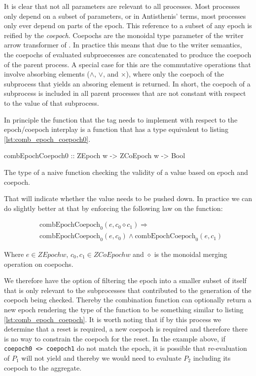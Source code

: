 It is clear that not all parameters are relevant to all processes.
Most processes only depend on a subset of parameters, or in
Antisthenis' terms, most processes only ever depend on parts of the
epoch. This reference to a subset of any epoch is reified by the
\emph{coepoch}. Coepochs are the monoidal type parameter of the writer
arrow transformer of .  In practice this means that due
to the writer semantics, the coepochs of evaluated subproecesses are
concatenated to produce the coepoch of the parent process. A special
case for this are the commutative operations that involve absorbing
elements (\(\land\), \(\lor\), and \(\times\)), where only the coepoch
of the subprocess that yields an absoring element is returned. In
short, the coepoch of a subprocess is included in all parent processes
that are not constant with respect to the value of that subprocess.

In principle the function that the  tag needs to
implement with respect to the epoch/coepoch interplay is a function
that has a type equivalent to listing \ref{lst:comb_epoch_coepoch0}.

\begin{code}
\begin{haskellcode}
combEpochCoepoch0 :: ZEpoch w -> ZCoEpoch w -> Bool
\end{haskellcode}
  \caption{\label{lst:comb_epoch_coepoch0}The type of a naive function
    checking the validity of a value based on epoch and coepoch.}
\end{code}

That will indicate whether the value needs to be pushed down. In
practice we can do slightly better at that by enforcing the following
law on the  function:

\begin{align*}
& \text{combEpochCoepoch}_0(e, c_0 \diamond c_1) \Rightarrow \\
& \text{combEpochCoepoch}_0(e,c_0) \land \text{combEpochCoepoch}_0(e,c_1)
\end{align*}

Where \(e \in \mathit{ZEpoch w}\), \(c_0,c_1 \in \mathit{ZCoEpoch w}\)
and \(\diamond\) is the monoidal merging operation on coepochs.

We therefore have the option of filtering the epoch into a smaller
subset of itself that is only relevant to the subprocesses that
contributed to the generation of the coepoch being checked. Thereby
the combination function can optionally return a new epoch rendering
the type of the function to be something similar to listing
\ref{lst:comb_epoch_coepoch}. It is worth noting that if by this
process we determine that a reset is required, a new coepoch is
required and therefore there is no way to constrain the coepoch for
the reset. In the example above, if \texttt{coepoch0 <> coepoch1} do
not match the epoch, it is possible that re-evaluation of \(P_1\) will
not yield  and thereby we would need to evaluate
\(P_2\) including its coepoch to the aggregate.

